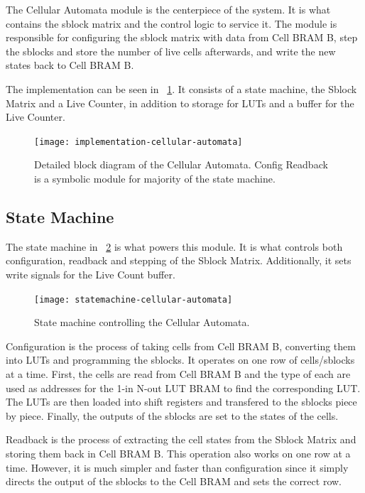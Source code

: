 The Cellular Automata module is the centerpiece of the system.
It is what contains the sblock matrix and the control logic to service it.
The module is responsible for configuring the sblock matrix with data from Cell BRAM B, step the sblocks and store the number of live cells afterwards, and write the new states back to Cell BRAM B.

The implementation can be seen in \figurename~\ref{fig:implementation-cellular-automata}.
It consists of a state machine, the Sblock Matrix and a Live Counter, in addition to storage for LUTs and a buffer for the Live Counter.

\begin{figure}[!ht]
    \centering
    \texttt{[image: implementation-cellular-automata]}
    \caption[Cellular Automata]{
        Detailed block diagram of the Cellular Automata.
        Config Readback is a symbolic module for majority of the state machine.
    }
    \label{fig:implementation-cellular-automata}
\end{figure}

\subsection{State Machine}

The state machine in \figurename~\ref{fig:statemachine-cellular-automata} is what powers this module.
It is what controls both configuration, readback and stepping of the Sblock Matrix.
Additionally, it sets write signals for the Live Count buffer.

\begin{figure}[!ht]
    \centering
    \texttt{[image: statemachine-cellular-automata]}
    \caption[Cellular Automata state machine]{
        State machine controlling the Cellular Automata.
    }
    \label{fig:statemachine-cellular-automata}
\end{figure}

Configuration is the process of taking cells from Cell BRAM B, converting them into LUTs and programming the sblocks.
It operates on one row of cells/sblocks at a time.
First, the cells are read from Cell BRAM B and the type of each are used as addresses for the 1-in N-out LUT BRAM to find the corresponding LUT.
The LUTs are then loaded into shift registers and transfered to the sblocks piece by piece.
Finally, the outputs of the sblocks are set to the states of the cells.

Readback is the process of extracting the cell states from the Sblock Matrix and storing them back in Cell BRAM B.
This operation also works on one row at a time.
However, it is much simpler and faster than configuration since it simply directs the output of the sblocks to the Cell BRAM and sets the correct row.

